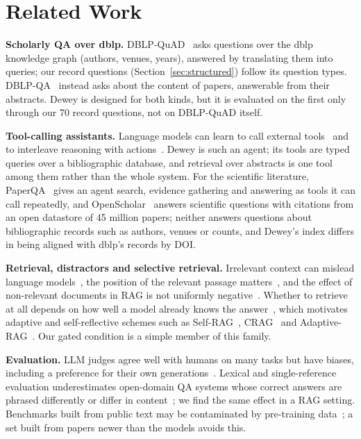 \documentclass[conference]{IEEEtran}
\begin{document}
\section{Related Work}

\textbf{Scholarly QA over dblp.} DBLP-QuAD~\cite{banerjee2023dblpquad} asks questions over the dblp
knowledge graph (authors, venues, years), answered by translating them into queries; our record questions
(Section~\ref{sec:structured}) follow its question types. DBLP-QA~\cite{neekhra2026ragscholar} instead
asks about the content of papers, answerable from their abstracts. Dewey is designed for both kinds, but it is evaluated on the first only through our 70 record questions,
not on DBLP-QuAD itself.

\textbf{Tool-calling assistants.} Language models can learn to call external
tools~\cite{schick2023toolformer} and to interleave reasoning with actions~\cite{yao2023react}. Dewey is
such an agent; its tools are typed queries over a bibliographic database, and retrieval over abstracts is
one tool among them rather than the whole system. For the scientific literature,
PaperQA~\cite{lala2023paperqa} gives an agent search, evidence gathering and answering as tools it can
call repeatedly, and OpenScholar~\cite{asai2026openscholar} answers scientific questions with citations
from an open datastore of 45 million papers; neither answers questions about bibliographic records such
as authors, venues or counts, and Dewey's index differs in being aligned with dblp's records by DOI.

\textbf{Retrieval, distractors and selective retrieval.} Irrelevant context can mislead language
models~\cite{shi2023distracted}, the position of the relevant passage matters~\cite{liu2024lost}, and
the effect of non-relevant documents in RAG is not uniformly negative~\cite{cuconasu2024noise}. Whether
to retrieve at all depends on how well a model already knows the answer~\cite{mallen2023trust}, which
motivates adaptive and self-reflective schemes such as Self-RAG~\cite{asai2024selfrag},
CRAG~\cite{yan2024crag} and Adaptive-RAG~\cite{jeong2024adaptiverag}. Our gated condition is a simple
member of this family.

\textbf{Evaluation.} LLM judges agree well with humans on many tasks but have biases, including a
preference for their own generations~\cite{zheng2023judge,panickssery2024selfpref}. Lexical and
single-reference evaluation underestimates open-domain QA systems whose correct answers are phrased
differently or differ in content~\cite{kamalloo2023evaluating}; we find the same effect in a RAG
setting. Benchmarks built from public text may be contaminated by pre-training
data~\cite{sainz2023contamination}; a set built from papers newer than the models avoids this.
\end{document}
